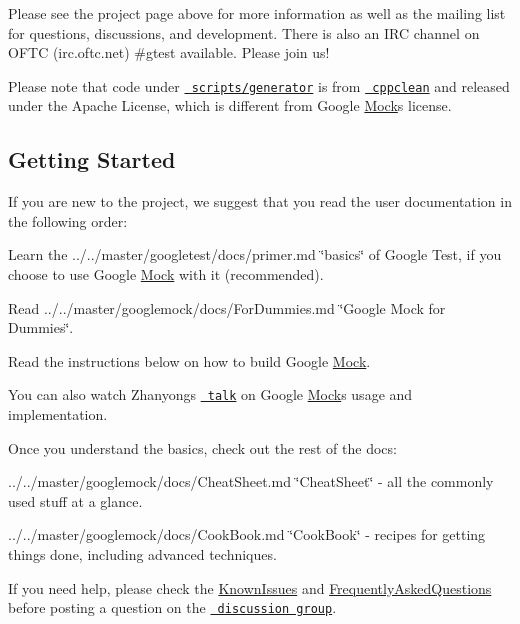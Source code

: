 Please see the project page above for more information as well as the mailing list for questions, discussions, and development. There is also an I\+RC channel on O\+F\+TC (irc.\+oftc.\+net) \#gtest available. Please join us!

Please note that code under \href{scripts/generator/}{\texttt{ scripts/generator}} is from \href{http://code.google.com/p/cppclean/}{\texttt{ cppclean}} and released under the Apache License, which is different from Google \mbox{\hyperlink{classMock}{Mock}}\textquotesingle{}s license.

\subsection*{Getting Started}

If you are new to the project, we suggest that you read the user documentation in the following order\+:


\begin{DoxyItemize}
\item Learn the ../../master/googletest/docs/primer.md \char`\"{}basics\char`\"{} of Google Test, if you choose to use Google \mbox{\hyperlink{classMock}{Mock}} with it (recommended).
\item Read ../../master/googlemock/docs/\+For\+Dummies.md \char`\"{}\+Google Mock for Dummies\char`\"{}.
\item Read the instructions below on how to build Google \mbox{\hyperlink{classMock}{Mock}}.
\end{DoxyItemize}

You can also watch Zhanyong\textquotesingle{}s \href{http://www.youtube.com/watch?v=sYpCyLI47rM}{\texttt{ talk}} on Google \mbox{\hyperlink{classMock}{Mock}}\textquotesingle{}s usage and implementation.

Once you understand the basics, check out the rest of the docs\+:


\begin{DoxyItemize}
\item ../../master/googlemock/docs/\+Cheat\+Sheet.md \char`\"{}\+Cheat\+Sheet\char`\"{} -\/ all the commonly used stuff at a glance.
\item ../../master/googlemock/docs/\+Cook\+Book.md \char`\"{}\+Cook\+Book\char`\"{} -\/ recipes for getting things done, including advanced techniques.
\end{DoxyItemize}

If you need help, please check the \mbox{\hyperlink{KnownIssues_8md}{Known\+Issues}} and \mbox{\hyperlink{FrequentlyAskedQuestions_8md}{Frequently\+Asked\+Questions}} before posting a question on the \href{http://groups.google.com/group/googlemock}{\texttt{ discussion group}}.


